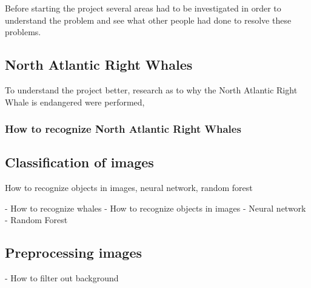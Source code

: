 Before starting the project several areas had to be investigated in order to understand the problem and see what other people had done to resolve these problems.

\subsection{North Atlantic Right Whales}
To understand the project better, research as to why the North Atlantic Right Whale is endangered were performed, 

\subsubsection{How to recognize North Atlantic Right Whales}

\subsection{Classification of images}
How to recognize objects in images, neural network, random forest

- How to recognize whales
- How to recognize objects in images
	- Neural network
	- Random Forest

\subsection{Preprocessing images}

- How to filter out background